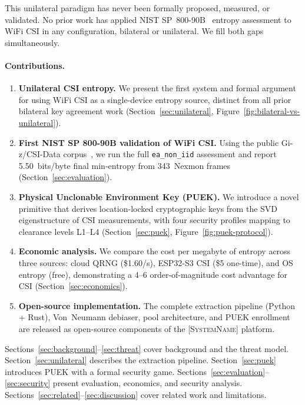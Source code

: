 \documentclass[sigconf,nonacm=false,anonymous]{acmart}
\newcommand{\zipminator}{\textsc{[SystemName]}\xspace}
\begin{document}
This unilateral paradigm has never been formally proposed, measured, or validated.
No prior work has applied NIST SP~800-90B~\cite{nist2018sp80090b} entropy assessment to WiFi CSI in any configuration, bilateral or unilateral.
We fill both gaps simultaneously.

\paragraph{Contributions.}
\begin{enumerate}
\item \textbf{Unilateral CSI entropy.}
We present the first system and formal argument for using WiFi CSI as a single-device entropy source, distinct from all prior bilateral key agreement work (Section~\ref{sec:unilateral}, Figure~\ref{fig:bilateral-vs-unilateral}).

\item \textbf{First NIST SP 800-90B validation of WiFi CSI.}
Using the public Gi-z/CSI-Data corpus~\cite{gringoli2019csidata}, we run the full \texttt{ea\_non\_iid} assessment and report 5.50~bits/byte final min-entropy from 343~Nexmon frames (Section~\ref{sec:evaluation}).

\item \textbf{Physical Unclonable Environment Key (PUEK).}
We introduce a novel primitive that derives location-locked cryptographic keys from the SVD eigenstructure of CSI measurements, with four security profiles mapping to clearance levels L1--L4 (Section~\ref{sec:puek}, Figure~\ref{fig:puek-protocol}).

\item \textbf{Economic analysis.}
We compare the cost per megabyte of entropy across three sources: cloud QRNG (\$1.60/s), ESP32-S3 CSI (\$5 one-time), and OS entropy (free), demonstrating a 4--6 order-of-magnitude cost advantage for CSI (Section~\ref{sec:economics}).

\item \textbf{Open-source implementation.}
The complete extraction pipeline (Python + Rust), Von~Neumann debiaser, pool architecture, and PUEK enrollment are released as open-source components of the \zipminator platform.
\end{enumerate}

\noindent
Sections~\ref{sec:background}--\ref{sec:threat} cover background and the threat model.
Section~\ref{sec:unilateral} describes the extraction pipeline.
Section~\ref{sec:puek} introduces PUEK with a formal security game.
Sections~\ref{sec:evaluation}--\ref{sec:security} present evaluation, economics, and security analysis.
Sections~\ref{sec:related}--\ref{sec:discussion} cover related work and limitations.
\end{document}
